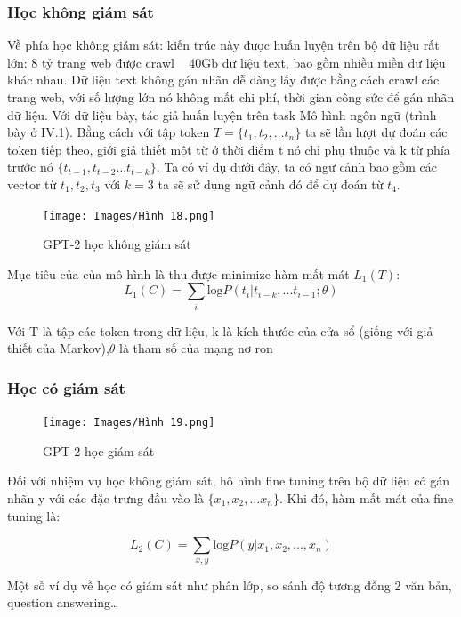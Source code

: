 \documentclass[a4paper]{article}
\theoremstyle{definition}
\begin{document}
\subsubsection{Học không giám sát}
Về phía học không giám sát:  kiến trúc này được huấn luyện trên bộ dữ liệu rất lớn: 8 tỷ trang web được crawl ~ 40Gb dữ liệu text, bao gồm nhiều miền dữ liệu khác nhau. Dữ liệu text không gán nhãn dễ dàng lấy được bằng  cách crawl các trang web, với số lượng lớn nó không mất chi phí, thời gian công sức để gán nhãn dữ liệu. Với dữ liệu bày, tác giả huấn luyện trên task Mô hình ngôn ngữ (trình bày ở IV.1). Bằng cách với tập token $T = \{t_1, t_2, …t_n\}$ ta sẽ lần lượt dự đoán các token tiếp theo, giới giả thiết một từ ở thời điểm t nó chỉ phụ thuộc và k từ phía trước nó $\{t_{t-1}, t_{t-2}…t_{t-k}\}$. Ta có ví dụ dưới đây, ta có ngữ cảnh bao gồm các vector  từ $t_1, t_2, t_3$ với $k = 3$ ta sẽ sử dụng ngữ cảnh đó để dự đoán từ $t_4$.
\begin{figure}[h!]
\begin{center}
\texttt{[image: Images/Hình 18.png]} \\[0.25in]

\caption{GPT-2 học không giám sát}
\end{center}
\end{figure}
Mục tiêu của của mô hình là thu được minimize hàm mất mát $L_1(T)$:
$$L_1(C) = \sum_{i}\text{log}P(t_i|t_{i-k}, ...t_{i-1}; \theta)$$

Với T là tập các token trong dữ liệu, k là kích thước của cửa sổ (giống với giả thiết của Markov),$\theta$ là tham số của mạng nơ ron 

\subsubsection{Học có giám sát}
\begin{figure}[h!]
\begin{center}
\texttt{[image: Images/Hình 19.png]} \\[0.25in]

\caption{GPT-2 học giám sát}
\end{center}
\end{figure}
Đối với nhiệm vụ học không giám sát, hô hình fine tuning trên bộ dữ liệu có gán nhãn y với các đặc trưng đầu vào là $\{x_1, x_2, … x_n\}$. Khi đó, hàm mất mát của fine tuning là: 


$$L_2(C) = \sum_{x,y} \text{log}P(y|x_1, x_2, ...,x_n)$$

Một số ví dụ về học có giám sát như phân lớp, so sánh độ tương đồng 2 văn bản, question answering…
\end{document}
